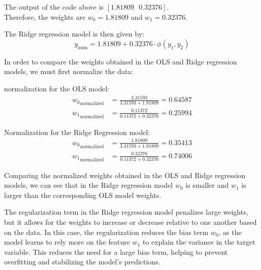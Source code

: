 \documentclass[12pt]{article}
\begin{document}
\begin{enumerate}
    \vspace{10pt}
    

    \vspace{10pt}
    The output of the code above is $[1.81809\text{ }0.32376]$.\\
    Therefore, the weights are $w_0 = 1.81809$ and $w_1 = 0.32376$.

    \vspace{10pt}
    The Ridge regression model is then given by:
    \begin{equation*}
        y_\text{num} = 1.81809 + 0.32376 \cdot \phi(y_1, y_2)
    \end{equation*}

    In order to compare the weights obtained in the OLS and Ridge regression models, we must first normalize the data:

    \vspace{10pt}
    normalization for the OLS model:
    \begin{equation*}
        \begin{aligned}
            {w_0}_\text{normalized} &= \frac{3.31593}{3.31593 + 1.81809} = 0.64587 \\
            {w_1}_\text{normalized} &= \frac{0.11372}{0.11372 + 0.32376} = 0.25994
        \end{aligned}
    \end{equation*}

    \vspace{10pt}
    Normalization for the Ridge Regression model:
    \begin{equation*}
        \begin{aligned}
            {w_0}_\text{normalized} &= \frac{1.81809}{3.31593 + 1.81809} = 0.35413 \\
            {w_1}_\text{normalized} &= \frac{0.32376}{0.11372 + 0.32376} = 0.74006
        \end{aligned}
    \end{equation*}

    \vspace{10pt}
    Comparing the normalized weights obtained in the OLS and Ridge regression models, we can see that in the Ridge regression model $w_0$ is smaller and $w_1$ is larger than the corresponding OLS model weights.

    The regularization term in the Ridge regression model penalizes large weights, but it allows for the weights to increase or decrease relative to one another based on the data. In this case, the regularization reduces the bias term $w_0$, as the model learns to rely more on the feature $w_1$
    to explain the variance in the target variable. This reduces the need for a large bias term, helping to prevent overfitting and stabilizing the model's predictions.


\end{enumerate}
\end{document}
